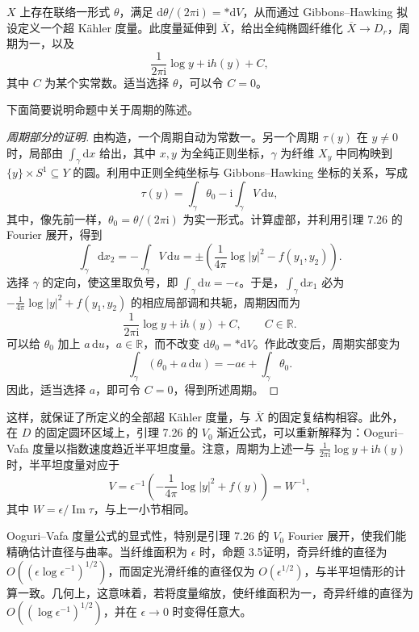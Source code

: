 \begin{proposition}\label{prop:7.27}
$X$ 上存在联络一形式 $\theta$，满足 $\mathrm d\theta/(2\pi\mathrm i)=*\mathrm dV$，从而通过 Gibbons--Hawking 拟设定义一个超 Kähler 度量。此度量延伸到 $\overline X$，给出全纯椭圆纤维化 $\overline X\to D_r$，周期为一，以及
\[
\frac1{2\pi\mathrm i}\log y+\mathrm i h(y)+C,
\]
其中 $C$ 为某个实常数。适当选择 $\theta$，可以令 $C=0$。
\end{proposition}

下面简要说明命题中关于周期的陈述。
\begin{proof}[周期部分的证明]
由构造，一个周期自动为常数一。另一个周期 $\tau(y)$ 在 $y\neq0$ 时，局部由 $\int_\gamma\mathrm dx$ 给出，其中 $x,y$ 为全纯正则坐标，$\gamma$ 为纤维 $X_y$ 中同构映到 $\{y\}\times S^1\subseteq Y$ 的圆。利用中正则全纯坐标与 Gibbons--Hawking 坐标的关系，写成
\[
\tau(y)=\int_\gamma\theta_0-\mathrm i\int_\gamma V\,\mathrm du,
\]
其中，像先前一样，$\theta_0=\theta/(2\pi\mathrm i)$ 为实一形式。计算虚部，并利用引理 7.26 的 Fourier 展开，得到
\[
\int_\gamma\mathrm dx_2=-\int_\gamma V\,\mathrm du
=\pm\left(\frac1{4\pi}\log|y|^2-f(y_1,y_2)\right).
\]
选择 $\gamma$ 的定向，使这里取负号，即 $\int_\gamma\mathrm du=-\epsilon$。于是，$\int_\gamma\mathrm dx_1$ 必为 $-\tfrac1{4\pi}\log|y|^2+f(y_1,y_2)$ 的相应局部调和共轭，周期因而为
\[
\frac1{2\pi\mathrm i}\log y+\mathrm i h(y)+C,
\qquad C\in\mathbb R.
\]
可以给 $\theta_0$ 加上 $a\,\mathrm du$，$a\in\mathbb R$，而不改变 $\mathrm d\theta_0=*\mathrm dV$。作此改变后，周期实部变为
\[
\int_\gamma(\theta_0+a\,\mathrm du)
=-a\epsilon+\int_\gamma\theta_0.
\]
因此，适当选择 $a$，即可令 $C=0$，得到所述周期。
\end{proof}

这样，就保证了所定义的全部超 Kähler 度量，与 $\overline X$ 的固定复结构相容。此外，在 $D$ 的固定圆环区域上，引理 7.26 的 $V_0$ 渐近公式，可以重新解释为：Ooguri--Vafa 度量以指数速度趋近半平坦度量。注意，周期为上述一与 $\tfrac1{2\pi\mathrm i}\log y+\mathrm i h(y)$ 时，半平坦度量对应于
\[
V=\epsilon^{-1}\left(-\frac1{4\pi}\log|y|^2+f(y)\right)=W^{-1},
\]
其中 $W=\epsilon/\operatorname{Im}\tau$，与上一小节相同。

Ooguri--Vafa 度量公式的显式性，特别是引理 7.26 的 $V_0$ Fourier 展开，使我们能精确估计直径与曲率。当纤维面积为 $\epsilon$ 时，命题 3.5证明，奇异纤维的直径为 $O((\epsilon\log\epsilon^{-1})^{1/2})$，而固定光滑纤维的直径仅为 $O(\epsilon^{1/2})$，与半平坦情形的计算一致。几何上，这意味着，若将度量缩放，使纤维面积为一，奇异纤维的直径为 $O((\log\epsilon^{-1})^{1/2})$，并在 $\epsilon\to0$ 时变得任意大。

